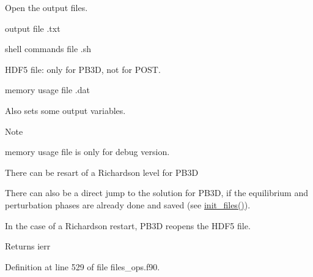 Open the output files. 


\begin{DoxyItemize}
\item output file {\ttfamily .txt}
\item shell commands file {\ttfamily .sh}
\item H\+D\+F5 file\+: only for P\+B3D, not for P\+O\+ST.
\item memory usage file {\ttfamily .dat}
\end{DoxyItemize}

Also sets some output variables.

\begin{DoxyNote}{Note}

\begin{DoxyEnumerate}
\item memory usage file is only for debug version.
\item There can be resart of a Richardson level for P\+B3D
\item There can also be a direct jump to the solution for P\+B3D, if the equilibrium and perturbation phases are already done and saved (see \hyperlink{namespacefiles__ops_a1e219b1147f109f758d03bef89d540e8}{init\+\_\+files()}).
\item In the case of a Richardson restart, P\+B3D reopens the H\+D\+F5 file.
\end{DoxyEnumerate}
\end{DoxyNote}
\begin{DoxyReturn}{Returns}
ierr 
\end{DoxyReturn}


Definition at line 529 of file files\+\_\+ops.\+f90.

